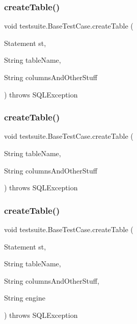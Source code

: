 \subsubsection{\texorpdfstring{create\+Table()}{createTable()}\hspace{0.1cm}{\footnotesize\ttfamily [1/4]}}
{\footnotesize\ttfamily void testsuite.\+Base\+Test\+Case.\+create\+Table (\begin{DoxyParamCaption}\item[{Statement}]{st,  }\item[{String}]{table\+Name,  }\item[{String}]{columns\+And\+Other\+Stuff }\end{DoxyParamCaption}) throws S\+Q\+L\+Exception\hspace{0.3cm}{\ttfamily [protected]}}

\mbox{\label{classtestsuite_1_1_base_test_case_afa4c0d18646a12915f111869b2275b87}} 
\subsubsection{\texorpdfstring{create\+Table()}{createTable()}\hspace{0.1cm}{\footnotesize\ttfamily [2/4]}}
{\footnotesize\ttfamily void testsuite.\+Base\+Test\+Case.\+create\+Table (\begin{DoxyParamCaption}\item[{String}]{table\+Name,  }\item[{String}]{columns\+And\+Other\+Stuff }\end{DoxyParamCaption}) throws S\+Q\+L\+Exception\hspace{0.3cm}{\ttfamily [protected]}}

\mbox{\label{classtestsuite_1_1_base_test_case_a16751e4f9c11d900e1d37e7f073950cd}} 
\subsubsection{\texorpdfstring{create\+Table()}{createTable()}\hspace{0.1cm}{\footnotesize\ttfamily [3/4]}}
{\footnotesize\ttfamily void testsuite.\+Base\+Test\+Case.\+create\+Table (\begin{DoxyParamCaption}\item[{Statement}]{st,  }\item[{String}]{table\+Name,  }\item[{String}]{columns\+And\+Other\+Stuff,  }\item[{String}]{engine }\end{DoxyParamCaption}) throws S\+Q\+L\+Exception\hspace{0.3cm}{\ttfamily [protected]}}

